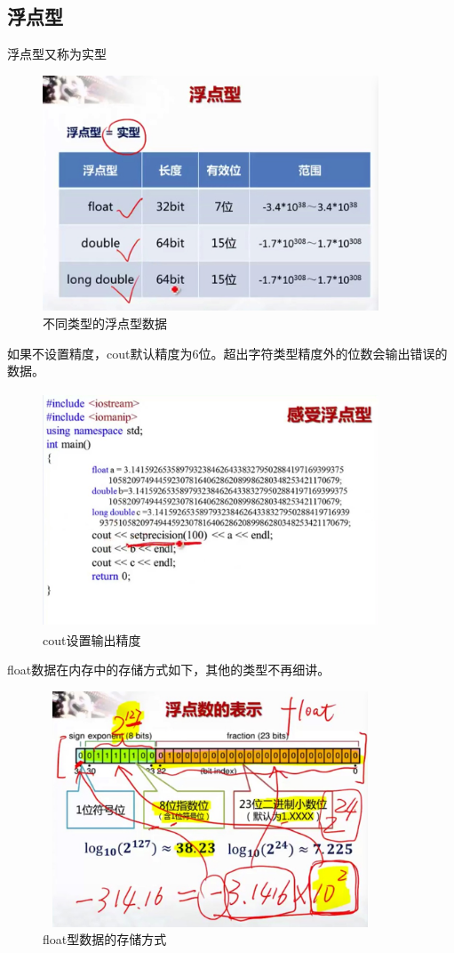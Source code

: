 \documentclass[UTF8]{article}
\begin{document}
\subsection{浮点型}
浮点型又称为实型
\begin{figure}[!htb]
\centering
\includegraphics[width=10cm,height=7cm]{fudiantypes.jpg}
\caption{不同类型的浮点型数据}
\hspace{0.05in}
\end{figure}
如果不设置精度，cout默认精度为6位。超出字符类型精度外的位数会输出错误的数据。
\begin{figure}[!htb]
\centering
\includegraphics[width=10cm,height=7cm]{coutsetprecision.jpg}
\caption{cout设置输出精度}
\hspace{0.05in}
\end{figure}
float数据在内存中的存储方式如下，其他的类型不再细讲。
\begin{figure}[!htb]
\centering
\includegraphics[width=10cm,height=7cm]{floatpresent.jpg}
\caption{float型数据的存储方式}
\hspace{0.05in}
\end{figure}
\end{document}

